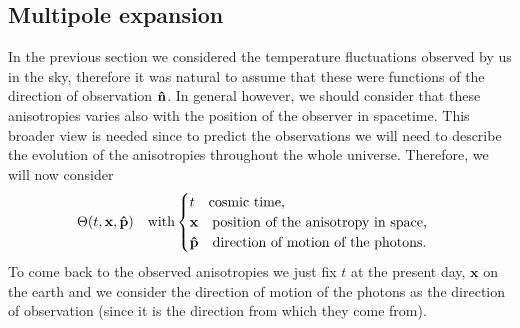\subsection{Multipole expansion}\label{sec:MultipoleExpansion}
In the previous section we considered the temperature fluctuations observed by us in the sky, therefore it was natural to assume that these were functions of the direction of observation $\mathbf{\hat{n}}$. In general however, we should consider that these anisotropies varies also with the position of the observer in spacetime. This broader view is needed since to predict the observations we will need to describe the evolution of the anisotropies throughout the whole universe. Therefore, we will now consider
\begin{equation}
    \Theta({t,\mathbf x,\mathbf{\hat{p}}})\quad\text{with}
    \begin{cases}
        t\quad\text{cosmic time,}\\
        \mathbf x\quad\text{position of the anisotropy in space,}\\
        \mathbf{\hat{p}}\quad\text{direction of motion of the photons}.
    \end{cases}
\end{equation}
To come back to the observed anisotropies we just fix $t$ at the present day, $\mathbf x$ on the earth and we consider the direction of motion of the photons as the direction of observation (since it is the direction from which they come from).\\

